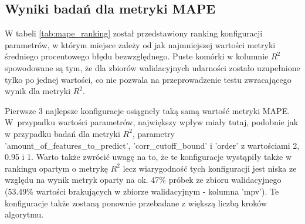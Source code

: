 \FloatBarrier
\subsection{Wyniki badań dla metryki MAPE}
W tabeli \ref{tab:mape_ranking} został przedstawiony ranking konfiguracji parametrów, w którym miejsce zależy od jak najmniejszej wartości metryki średniego procentowego błędu bezwzględnego. Puste komórki w kolumnie $R^{2}$ spowodowane są tym, że dla zbiorów walidacyjnych udarności zostało uzupełnione tylko po jednej wartości, co nie pozwala na przeprowadzenie testu zwracającego wynik dla metryki $R^{2}$.

Pierwsze 3 najlepsze konfiguracje osiągneły taką samą wartość metryki MAPE. W~przypadku wartości parametrów, największy wpływ miały tutaj, podobnie jak w przypadku badań dla metryki $R^{2}$, parametry 'amount\_of\_features\_to\_predict', 'corr\_cutoff\_bound' i 'order' z wartościami 2, 0.95 i 1. Warto także zwrócić uwagę na to, że te konfiguracje wystąpiły także w rankingu opartym o metrykę $R^{2}$ lecz wiarygodność tych konfiguracji jest niska ze względu na wynik metryk oparty na ok. 47\% próbek ze zbioru walidacyjnego (53.49\% wartości brakujących w zbiorze walidacyjnym - kolumna 'mpv'). Te konfiguracje także zostaną ponownie przebadane z większą liczbą kroków algorytmu.

